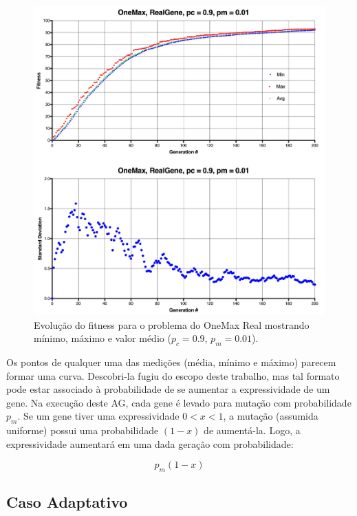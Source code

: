 \begin{figure}[ht!]
    \centering \includegraphics[width=1.0\textwidth]{onemax_real.jpg}
    \caption{Evolução do fitness para o problema do OneMax Real mostrando mínimo, máximo e valor médio ($p_c=0.9$, $p_m=0.01$).}
    \label{fig:onemax_real}
\end{figure}

Os pontos de qualquer uma das medições (média, mínimo e máximo) parecem formar uma curva. Descobri-la fugiu do escopo deste trabalho, mas tal formato pode estar associado à probabilidade de se aumentar a expressividade de um gene. Na execução deste AG, cada gene é levado para mutação com probabilidade $p_m$. Se um gene tiver uma expressividade $0 < x < 1$, a mutação (assumida uniforme) possui uma probabilidade $(1-x)$ de aumentá-la. Logo, a expressividade aumentará em uma dada geração com probabilidade:

\begin{equation}
	p_m(1-x)
\end{equation}

\subsection{Caso Adaptativo}

